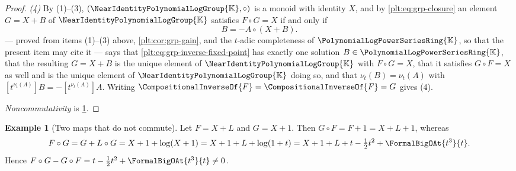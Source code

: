 \documentclass[11pt,oneside]{article}
\theoremstyle{plain}
\theoremstyle{definition}
\newtheorem{example}[theorem]{Example}
\theoremstyle{remark}
\newcommand{\K}{\mathbb{K}}
\newcommand{\PLpow}{\PolynomialLogPowerSeriesRing{\K}}   %
\newcommand{\Gnear}{\NearIdentityPolynomialLogGroup{\K}} %
\newcommand{\ordt}{\nu_{t}}                              %
\newcommand{\compose}{\mathbin{\circ}}
\newcommand{\rev}[1]{\CompositionalInverseOf{#1}}
\begin{document}
\begin{proof}
\emph{(4)}  By (1)--(3), \((\Gnear,\compose)\) is a monoid with identity
\(X\), and by \eqref{plt:eq:grp-closure} an element \(G=X+B\) of \(\Gnear\)
satisfies \(F\compose G=X\) if and only if
\begin{equation}\label{plt:eq:grp-inverse-fixed-point}
  B=-A\compose(X+B).
\end{equation}
 --- proved from items (1)--(3) above,
\cref{plt:cor:grp-gain}, and the \(t\)-adic completeness of \(\PLpow\), so that
the present item may cite it --- says that
\eqref{plt:eq:grp-inverse-fixed-point} has exactly one solution
\(B\in\PLpow\), that the resulting \(G=X+B\) is the unique element of
\(\Gnear\) with \(F\compose G=X\), that it satisfies \(G\compose F=X\) as well
and is the unique element of \(\Gnear\) doing so, and that
\(\ordt(B)=\ordt(A)\) with \([t^{\ordt(A)}]B=-[t^{\ordt(A)}]A\).  Writing
\(\CompositionalInverseOf{F}=\rev{F}=G\) gives (4).

\emph{Noncommutativity} is \cref{plt:ex:grp-noncommutative}.
\end{proof}

\begin{example}[Two maps that do not commute]\label{plt:ex:grp-noncommutative}
Let \(F=X+L\) and \(G=X+1\).  Then \(G\compose F=F+1=X+L+1\), whereas
\[
  F\compose G=G+L\compose G=X+1+\log(X+1)
  =X+1+L+\log(1+t)
  =X+1+L+t-\tfrac12t^2+\FormalBigOAt{t^3}{t}.
\]
Hence \(F\compose G-G\compose F=t-\frac12t^2+\FormalBigOAt{t^3}{t}\neq0\).
\end{example}
\end{document}
